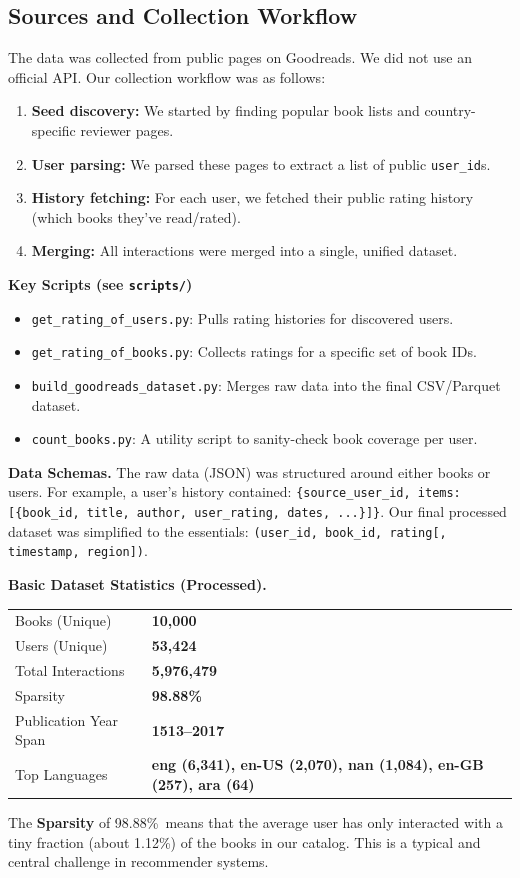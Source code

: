 \documentclass[11pt,a4paper]{article}
\newcommand{\NBooks}{10{,}000}
\newcommand{\NUsers}{53{,}424}
\newcommand{\NInter}{5{,}976{,}479}
\newcommand{\Sparsity}{98.88\%}
\newcommand{\YearSpan}{1513--2017}
\newcommand{\TopLangs}{eng (6{,}341), en-US (2{,}070), nan (1{,}084), en-GB (257), ara (64)}
\begin{document}
\subsection*{Sources and Collection Workflow}
The data was collected from public pages on Goodreads. We did not use an official API. Our collection workflow was as follows:
\begin{enumerate}
    \item \textbf{Seed discovery:} We started by finding popular book lists and country-specific reviewer pages.
    \item \textbf{User parsing:} We parsed these pages to extract a list of public \texttt{user\_id}s.
    \item \textbf{History fetching:} For each user, we fetched their public rating history (which books they've read/rated).
    \item \textbf{Merging:} All interactions were merged into a single, unified dataset.
\end{enumerate}

\noindent\textbf{Key Scripts \small (see \texttt{scripts/})}
\begin{itemize}
  \item \texttt{get\_rating\_of\_users.py}: Pulls rating histories for discovered users.
  \item \texttt{get\_rating\_of\_books.py}: Collects ratings for a specific set of book IDs.
  \item \texttt{build\_goodreads\_dataset.py}: Merges raw data into the final CSV/Parquet dataset.
  \item \texttt{count\_books.py}: A utility script to sanity-check book coverage per user.
\end{itemize}

\textbf{Data Schemas.} The raw data (JSON) was structured around either books or users. For example, a user's history contained: \texttt{\{source\_user\_id, items:[\{book\_id, title, author, user\_rating, dates, ...\}]\}}. Our final processed dataset was simplified to the essentials: \texttt{(user\_id, book\_id, rating[, timestamp, region])}.

\noindent\textbf{Basic Dataset Statistics (Processed).}
\begin{center}
\begin{tabular}{@{}l l@{}}\toprule
Books (Unique) & \textbf{\NBooks} \\
Users (Unique) & \textbf{\NUsers} \\
Total Interactions & \textbf{\NInter} \\
Sparsity & \textbf{\Sparsity} \\
Publication Year Span & \textbf{\YearSpan} \\
Top Languages & \textbf{\TopLangs} \\ \bottomrule
\end{tabular}
\end{center}
The \textbf{Sparsity} of \Sparsity\ means that the average user has only interacted with a tiny fraction (about 1.12\%) of the books in our catalog. This is a typical and central challenge in recommender systems.
\end{document}
